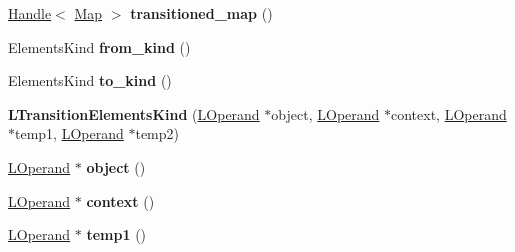 \begin{DoxyCompactItemize}
\item 
\hyperlink{classv8_1_1internal_1_1_handle}{Handle}$<$ \hyperlink{classv8_1_1internal_1_1_map}{Map} $>$ {\bfseries transitioned\+\_\+map} ()\hypertarget{classv8_1_1internal_1_1_l_transition_elements_kind_a4ffe4230acac522bfd54c3789ccd213b}{}\label{classv8_1_1internal_1_1_l_transition_elements_kind_a4ffe4230acac522bfd54c3789ccd213b}

\item 
Elements\+Kind {\bfseries from\+\_\+kind} ()\hypertarget{classv8_1_1internal_1_1_l_transition_elements_kind_af634084f5d3f05e0700cc8d35a797465}{}\label{classv8_1_1internal_1_1_l_transition_elements_kind_af634084f5d3f05e0700cc8d35a797465}

\item 
Elements\+Kind {\bfseries to\+\_\+kind} ()\hypertarget{classv8_1_1internal_1_1_l_transition_elements_kind_a131f478caf0a117639ee35cd0bdeed59}{}\label{classv8_1_1internal_1_1_l_transition_elements_kind_a131f478caf0a117639ee35cd0bdeed59}

\item 
{\bfseries L\+Transition\+Elements\+Kind} (\hyperlink{classv8_1_1internal_1_1_l_operand}{L\+Operand} $\ast$object, \hyperlink{classv8_1_1internal_1_1_l_operand}{L\+Operand} $\ast$context, \hyperlink{classv8_1_1internal_1_1_l_operand}{L\+Operand} $\ast$temp1, \hyperlink{classv8_1_1internal_1_1_l_operand}{L\+Operand} $\ast$temp2)\hypertarget{classv8_1_1internal_1_1_l_transition_elements_kind_a9397d59b64b53e554e3fb4964762311c}{}\label{classv8_1_1internal_1_1_l_transition_elements_kind_a9397d59b64b53e554e3fb4964762311c}

\item 
\hyperlink{classv8_1_1internal_1_1_l_operand}{L\+Operand} $\ast$ {\bfseries object} ()\hypertarget{classv8_1_1internal_1_1_l_transition_elements_kind_a0257a511e1579fbc39001caf5b0ca855}{}\label{classv8_1_1internal_1_1_l_transition_elements_kind_a0257a511e1579fbc39001caf5b0ca855}

\item 
\hyperlink{classv8_1_1internal_1_1_l_operand}{L\+Operand} $\ast$ {\bfseries context} ()\hypertarget{classv8_1_1internal_1_1_l_transition_elements_kind_aad280c0f1cf8e5ca120cf21b05bd93f0}{}\label{classv8_1_1internal_1_1_l_transition_elements_kind_aad280c0f1cf8e5ca120cf21b05bd93f0}

\item 
\hyperlink{classv8_1_1internal_1_1_l_operand}{L\+Operand} $\ast$ {\bfseries temp1} ()\hypertarget{classv8_1_1internal_1_1_l_transition_elements_kind_a07b62a018a3e2f5c08b561316dd4ac81}{}\label{classv8_1_1internal_1_1_l_transition_elements_kind_a07b62a018a3e2f5c08b561316dd4ac81}


\end{DoxyCompactItemize}
